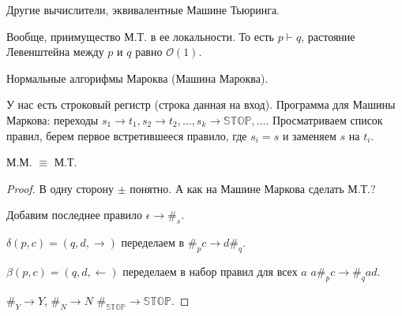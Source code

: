 Другие вычислители, эквивалентные Машине Тьюринга.

Вообще, приимущество М.Т. в ее локальности. То есть $p\vdash q$, растояние Левенштейна между $p$ и $q$ равно $\mathcal{O} (1)$.

\begin{definition}
    Нормальные алгорифмы Мароква (Машина Мароква).

    У нас есть строковый регистр (строка данная на вход).
    Программа для Машины Маркова: переходы $s_1 \to t_1, s_2 \to t_2, \dots, s_k \to \mathbb{STOP}, \dots$.
    Просматриваем список правил, берем первое встретившееся правило, где $s_i = s$ и заменяем $s$ на $t_i$.
\end{definition}

\begin{theorem} 
    М.М. $\equiv$ М.Т.
\end{theorem}
\begin{proof}
    В одну сторону $\pm$ понятно. А как на Машине Маркова сделать М.Т.?

    Добавим последнее правило $\epsilon \to \#_s$.

    $\delta (p, c) = (q, d , \rightarrow)$ переделаем в $\#_p c \to d\#_q$.

    $\beta (p, c) = (q, d, \leftarrow)$ переделаем в набор правил для всех $a$ $a\#_p c \to \#_q a d$.

    $\#_Y \to Y$, $\#_N \to N$
    $\#_{\mathbb{STOP}} \to \mathbb{STOP}$.

\end{proof}
